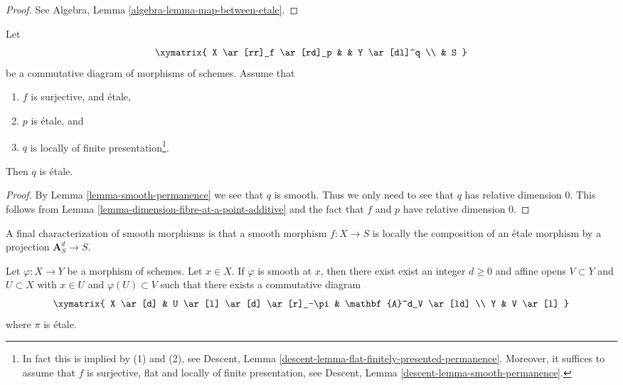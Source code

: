 \begin{proof}
See Algebra, Lemma \ref{algebra-lemma-map-between-etale}.
\end{proof}

\begin{lemma}
\label{lemma-etale-permanence-two}
Let
$$
\xymatrix{
X \ar[rr]_f \ar[rd]_p & &
Y \ar[dl]^q \\
& S
}
$$
be a commutative diagram of morphisms of schemes. Assume that
\begin{enumerate}
\item $f$ is surjective, and \'etale,
\item $p$ is \'etale, and
\item $q$ is locally of finite presentation\footnote{In fact this
is implied by (1) and (2), see
Descent, Lemma \ref{descent-lemma-flat-finitely-presented-permanence}.
Moreover, it suffices to assume that $f$ is surjective, flat and
locally of finite presentation, see
Descent, Lemma \ref{descent-lemma-smooth-permanence}.}.
\end{enumerate}
Then $q$ is \'etale.
\end{lemma}

\begin{proof}
By Lemma \ref{lemma-smooth-permanence} we see that $q$ is smooth.
Thus we only need to see that $q$ has relative dimension $0$.
This follows from Lemma \ref{lemma-dimension-fibre-at-a-point-additive}
and the fact that $f$ and $p$ have relative dimension $0$.
\end{proof}

\noindent
A final characterization of smooth morphisms is that a smooth morphism
$f : X \to S$ is locally the composition of an \'etale morphism by a projection
$\mathbf{A}_S^d \to S$.

\begin{lemma}
\label{lemma-smooth-etale-over-affine-space}
Let $\varphi : X \to Y$ be a morphism of schemes. Let $x \in X$.
If $\varphi$ is smooth at $x$, then there exist exist an integer $d \geq 0$
and affine opens $V \subset Y$ and $U \subset X$ with $x \in U$ and
$\varphi(U) \subset V$ such that there exists a commutative diagram
$$
\xymatrix{
X \ar[d] & U \ar[l] \ar[d] \ar[r]_-\pi & \mathbf{A}^d_V \ar[ld] \\
Y & V \ar[l]
}
$$
where $\pi$ is \'etale.
\end{lemma}

